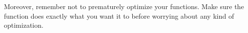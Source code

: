 Moreover, remember not to prematurely optimize your functions.
Make sure the function does exactly what you want it to before worrying about any kind of optimization.

\begin{comment} %
\begin{problem}
Optimize a function you wrote in a previous lab using the techniques discussed in this lab.
Consider optimizing one of the following:
\begin{enumerate}
\item Householder triangularization or Hessenburg decomposition
\item The QR Algorithm
\item Image Segmentation
\end{enumerate}
 Compare the timings of the function before and after optimization using your \li{compare_timings()} function.
Write a short paragraph describing what you did to optimize your function.
\end{problem}
\end{comment}
